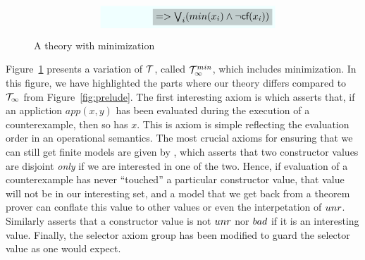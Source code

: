 \begin{figure}
{\[\begin{array}{c}
\begin{array}{lll}
                 & \formula{\quad\qquad\qquad \highlight{ => \bigvee_i (min(x_i)\land\neg\lcf{x_i})}}
\end{array}
\end{array}\]}
\caption{A theory with minimization}\label{fig:min-theory}
\end{figure}

Figure~\ref{fig:min-theory} presents a variation of ${\cal T}$, called ${\cal T}_{\infty}^{min}$, which includes minimization.
In this figure, we have highlighted the parts where our theory differs compared to ${\cal T}_\infty$ from
Figure~\ref{fig:prelude}. The first interesting axiom is  which asserts that, if an 
appliction $app(x,y)$ has been evaluated during the execution of a counterexample, then so has $x$. This
is axiom is simple reflecting the evaluation order in an operational semantics. The most crucial axioms for
ensuring that we can still get finite models are given by , which asserts that two constructor
values are disjoint {\em only} if we are interested in one of the two. Hence, if evaluation of a counterexample
has never ``touched'' a particular constructor value, that value will not be in our interesting set, and a model
that we get back from a theorem prover can conflate this value to other values or even the interpetation of $\mathop{unr}$.
Similarly  asserts that a constructor value is not $\mathop{unr}$ nor $\mathop{bad}$ if it is an interesting value. 
Finally, the selector axiom group  has been modified to guard the selector value as one would expect.



